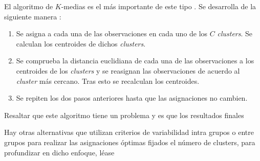\noindent El algoritmo de $K$-medias es el más importante de este tipo \cite{Johnson 2007}. Se desarrolla de la siguiente manera  :
\begin{enumerate}
\item Se asigna a cada una de las observaciones en cada uno de los $C$ \emph{clusters}. Se calculan los centroides de dichos \emph{clusters}.
\item Se comprueba la distancia euclidiana de cada una de las observaciones a los centroides de los \emph{clusters} y se reasignan las observaciones de acuerdo al \emph{cluster} más cercano. Tras esto se recalculan los centroides.
\item Se repiten los dos pasos anteriores hasta que las asignaciones no cambien. 
\end{enumerate}

\noindent Resaltar que este algoritmo tiene un problema y es que los resultados finales 

\noindent Hay otras alternativas que utilizan criterios de variabilidad intra grupos o entre grupos para realizar las asignaciones óptimas fijados el número de clusters, para profundizar en dicho enfoque, léase \cite{Everitt 2011, Peña 2002, Hartigan 1975}







